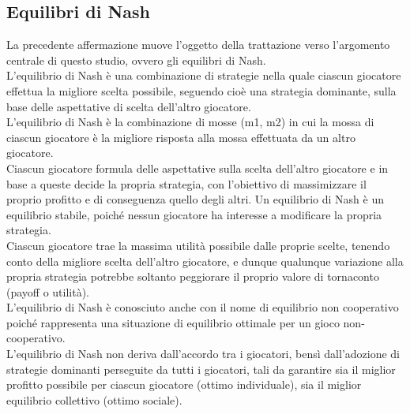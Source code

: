 \begin{flushleft}
\section{Equilibri di Nash}
La precedente affermazione muove l'oggetto della trattazione verso l'argomento centrale di questo studio, ovvero gli equilibri di Nash.\\
L'equilibrio di Nash è una combinazione di strategie nella quale ciascun giocatore effettua la migliore scelta possibile, seguendo cioè una strategia dominante, sulla base delle aspettative di scelta dell'altro giocatore.\\
L'equilibrio di Nash è la combinazione di mosse (m1, m2) in cui la mossa di ciascun giocatore è la migliore risposta alla mossa effettuata da un altro giocatore.\\
Ciascun giocatore formula delle aspettative sulla scelta dell'altro giocatore e in base a queste decide la propria strategia, con l'obiettivo di massimizzare il proprio profitto e di conseguenza quello degli altri.
Un equilibrio di Nash è un equilibrio stabile, poiché nessun giocatore ha interesse a modificare la propria strategia.\\
Ciascun giocatore trae la massima utilità possibile dalle proprie scelte, tenendo conto della migliore scelta dell'altro giocatore, e dunque qualunque variazione alla propria strategia potrebbe soltanto peggiorare il proprio valore di tornaconto (payoff o utilità).\\
L'equilibrio di Nash è conosciuto anche con il nome di equilibrio non cooperativo poiché rappresenta una situazione di equilibrio ottimale per un gioco non-cooperativo.\\
L'equilibrio di Nash non deriva dall'accordo tra i giocatori, bensì dall'adozione di strategie dominanti perseguite da tutti i giocatori, tali da garantire sia il miglior profitto possibile per ciascun giocatore (ottimo individuale), sia il miglior equilibrio collettivo (ottimo sociale).\newline


\end{flushleft}
